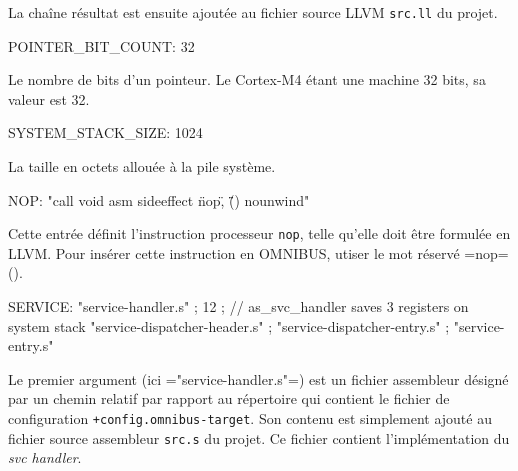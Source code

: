 La chaîne résultat est ensuite ajoutée au fichier source LLVM \texttt{src.ll} du projet.








\begin{OMNIBUS}
POINTER_BIT_COUNT:
  32
\end{OMNIBUS}

Le nombre de bits d'un pointeur. Le Cortex-M4 étant une machine 32 bits, sa valeur est 32.













\begin{OMNIBUS}
SYSTEM_STACK_SIZE:
  1024
\end{OMNIBUS}

La taille en octets allouée à la pile système.







\begin{OMNIBUS}
NOP:
  "call void asm sideeffect \"nop\", \"\"() nounwind"
\end{OMNIBUS}

Cette entrée définit l'instruction processeur \texttt{nop}, telle qu'elle doit être formulée en LLVM. Pour insérer cette instruction en OMNIBUS, utiser le mot réservé \omnibus=nop= ().






\begin{OMNIBUS}
SERVICE:
  "service-handler.s" ;
  12 ; // as_svc_handler saves 3 registers on system stack
  "service-dispatcher-header.s" ;
  "service-dispatcher-entry.s" ;
  "service-entry.s"
\end{OMNIBUS}

Le premier argument (ici \omnibus="service-handler.s"=) est un fichier assembleur désigné par un chemin relatif par rapport au répertoire qui contient le fichier de configuration \texttt{+config.omnibus-target}. Son contenu est simplement ajouté au fichier source assembleur \texttt{src.s} du projet. Ce fichier contient l'implémentation du \emph{svc handler}.

